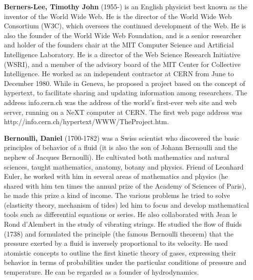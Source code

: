 \textbf{Berners-Lee, Timothy John} (1955-) is an English physicist best known as the inventor of the World Wide Web. He is the director of the World Wide Web Consortium (W3C), which oversees the continued development of the Web. He is also the founder of the World Wide Web Foundation, and is a senior researcher and holder of the founders chair at the MIT Computer Science and Artificial Intelligence Laboratory. He is a director of the Web Science Research Initiative (WSRI), and a member of the advisory board of the MIT Center for Collective Intelligence. He worked as an independent contractor at CERN from June to December 1980. While in Geneva, he proposed a project based on the concept of hypertext, to facilitate sharing and updating information among researchers. The address info.cern.ch was the address of the world's first-ever web site and web server, running on a NeXT computer at CERN. The first web page address was http://info.cern.ch/hypertext/WWW/TheProject.htm.

\textbf{Bernoulli, Daniel} (1700-1782) was a Swiss scientist who discovered the basic principles of behavior of a fluid (it is also the son of Johann Bernoulli and the nephew of Jacques Bernoulli). He cultivated both mathematics and natural sciences, taught mathematics, anatomy, botany and physics. Friend of Leonhard Euler, he worked with him in several areas of mathematics and physics (he shared with him ten times the annual prize of the Academy of Sciences of Paris), he made this prize a kind of income. The various problems he tried to solve (elasticity theory, mechanism of tides) led him to focus and develop mathematical tools such as differential equations or series. He also collaborated with Jean le Rond d'Alembert in the study of vibrating strings. He studied the flow of fluids (1738) and formulated the principle (the famous Bernoulli theorem) that the pressure exerted by a fluid is inversely proportional to its velocity. He used atomistic concepts to outline the first kinetic theory of gases, expressing their behavior in terms of probabilities under the particular conditions of pressure and temperature. He can be regarded as a founder of hydrodynamics.

